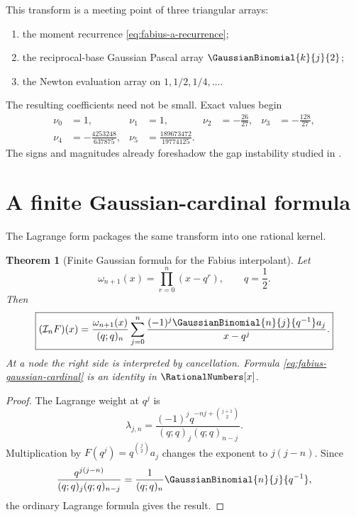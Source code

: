 \documentclass[11pt,oneside]{book}
\numberwithin{equation}{chapter}
\newtheorem{theorem}{Theorem}[chapter]
\theoremstyle{definition}
\theoremstyle{remark}
\newcommand{\twobinom}[2]{\GaussianBinomial{#1}{#2}{2}}
\newcommand{\Interp}{\mathcal I}
\begin{document}
This transform is a meeting point of three triangular arrays:
\begin{enumerate}
\item the moment recurrence \eqref{eq:fabius-a-recurrence};
\item the reciprocal-base Gaussian Pascal array $\twobinom{k}{j}$;
\item the Newton evaluation array on $1,1/2,1/4,\ldots$.
\end{enumerate}
The resulting coefficients need not be small.  Exact values begin
\begin{align}
 \nu_0&=1,
 &\nu_1&=1,
 &\nu_2&=-\frac{26}{27},
 &\nu_3&=-\frac{128}{27},
 \label{eq:first-fabius-newton-1}\\
 \nu_4&=-\frac{4253248}{637875},
 &\nu_5&=\frac{189673472}{19774125}.
 \label{eq:first-fabius-newton-2}
\end{align}
The signs and magnitudes already foreshadow the gap instability studied in
.

\section{A finite Gaussian-cardinal formula}

The Lagrange form packages the same transform into one rational kernel.

\begin{theorem}[Finite Gaussian formula for the Fabius interpolant]
\label{thm:fabius-gaussian-cardinal}
Let
\[
 \omega_{n+1}(x)=\prod_{r=0}^{n}(x-q^r),
 \qquad q=\frac12.
\]
Then
\begin{equation}
 \boxed{
 (\Interp_nF)(x)
 =\frac{\omega_{n+1}(x)}{(q;q)_n}
   \sum_{j=0}^{n}
   \frac{(-1)^j\GaussianBinomial{n}{j}{q^{-1}}a_j}{x-q^j}.}
 \label{eq:fabius-gaussian-cardinal}
\end{equation}
At a node the right side is interpreted by cancellation.  Formula
\eqref{eq:fabius-gaussian-cardinal} is an identity in $\RationalNumbers[x]$.
\end{theorem}

\begin{proof}
The Lagrange weight at $q^j$ is
\[
 \lambda_{j,n}
 =\frac{(-1)^jq^{-nj+\binom{j+1}{2}}}
 {(q;q)_j(q;q)_{n-j}}.
\]
Multiplication by $F(q^j)=q^{\binom j2}a_j$ changes the exponent to
$j(j-n)$.  Since
\[
 \frac{q^{j(j-n)}}{(q;q)_j(q;q)_{n-j}}
 =\frac1{(q;q)_n}\GaussianBinomial{n}{j}{q^{-1}},
\]
the ordinary Lagrange formula gives the result.
\end{proof}
\end{document}
